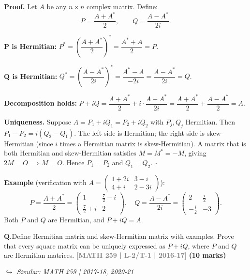 \documentclass[12pt,a3paper]{article}
\newcommand{\yr}[1]{\hfill\textcolor{gray}{\small\textbf{[#1]}}}
\newcommand{\mk}[1]{\textcolor{orange!70!black}{\small\textbf{(#1 marks)}}}
\newcommand{\variant}[1]{\par\vspace{1pt}\textcolor{blue!50!black}%
  {\footnotesize\textit{$\hookrightarrow$ Similar: #1}}}
\newcounter{qnum}
\newcommand{\Q}[1]{%
  \needspace{4\baselineskip}
  \refstepcounter{qnum}
  \vspace{6pt}
  \noindent\textbf{Q\theqnum.}\enspace #1\par
}
\begin{document}
\begin{tcolorbox}[enhanced,breakable,
  colback=cG!4,colframe=cG,boxrule=0.8pt,arc=5pt,
  title={\textbf{Answer --- Every Square Matrix $= P + iQ$, $P$ and $Q$ Hermitian}},
  fonttitle=\bfseries\color{white},colbacktitle=cG]
 
\textbf{Proof.} Let $A$ be any $n\times n$ complex matrix. Define:
\[
P = \frac{A + A^*}{2}, \qquad Q = \frac{A - A^*}{2i}.
\]
 
\textbf{P is Hermitian:}
$P^* = \left(\dfrac{A+A^*}{2}\right)^* = \dfrac{A^* + A}{2} = P$. \checkmark
 
\textbf{Q is Hermitian:}
$Q^* = \left(\dfrac{A-A^*}{2i}\right)^* = \dfrac{A^* - A}{-2i} = \dfrac{A-A^*}{2i} = Q$. \checkmark
 
\textbf{Decomposition holds:}
$P + iQ = \dfrac{A+A^*}{2} + i\cdot\dfrac{A-A^*}{2i} = \dfrac{A+A^*}{2} + \dfrac{A-A^*}{2} = A$. \checkmark
 
\medskip
\textbf{Uniqueness.} Suppose $A = P_1 + iQ_1 = P_2 + iQ_2$ with $P_j,Q_j$ Hermitian.
Then $P_1 - P_2 = i(Q_2 - Q_1)$.
The left side is Hermitian; the right side is skew-Hermitian (since $i$ times a Hermitian matrix is skew-Hermitian).
A matrix that is both Hermitian and skew-Hermitian satisfies $M = M^* = -M$, giving $2M=O \implies M=O$.
Hence $P_1 = P_2$ and $Q_1 = Q_2$. \hfill$\square$
 
\medskip
\textbf{Example} (verification with $A = \begin{pmatrix}1+2i&3-i\\4+i&2-3i\end{pmatrix}$):
\[
P = \frac{A+A^*}{2} = \begin{pmatrix}1&\frac{7}{2}-i\\\frac{7}{2}+i&2\end{pmatrix},\quad
Q = \frac{A-A^*}{2i} = \begin{pmatrix}2&\frac{i}{2}\\-\frac{i}{2}&-3\end{pmatrix}.
\]
Both $P$ and $Q$ are Hermitian, and $P+iQ = A$. \checkmark
 
\end{tcolorbox}
 

\Q{Define Hermitian matrix and skew-Hermitian matrix with examples. Prove that every square matrix can be uniquely expressed as $P + iQ$, where $P$ and $Q$ are Hermitian matrices.
\yr{MATH 259 | L-2/T-1 | 2016-17} \mk{10}
\variant{MATH 259 | 2017-18, 2020-21}}
\end{document}
